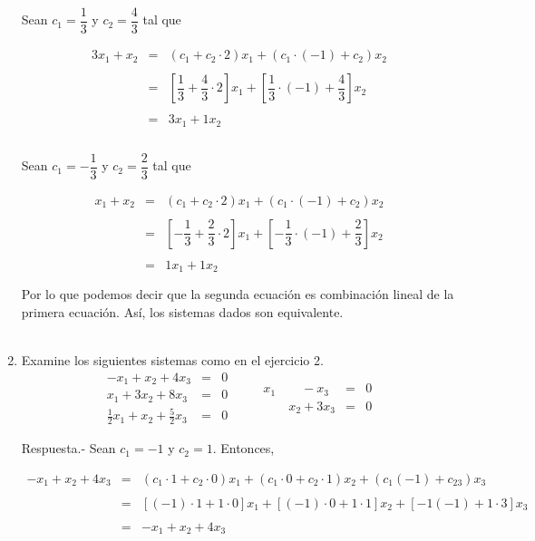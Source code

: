 \begin{enumerate}[\bfseries 1.]
	Sean $c_1=\dfrac{1}{3}$ y $c_2=\dfrac{4}{3}$ tal que

	$$\begin{array}{rcl}
	    3x_1+x_2&=&\left(c_1+c_2\cdot 2\right)x_1+\left(c_1\cdot(-1)+c_2\right)x_2\\\\
		    &=&\left[\dfrac{1}{3}+\dfrac{4}{3}\cdot 2\right]x_1+\left[\dfrac{1}{3}\cdot(-1)+\dfrac{4}{3}\right]x_2\\\\
		    &=&3x_1+1x_2\\\\
	\end{array}$$

	Sean $c_1=-\dfrac{1}{3}$ y $c_2=\dfrac{2}{3}$ tal que

	$$\begin{array}{rcl}
	    x_1+x_2&=&\left(c_1+c_2\cdot 2\right)x_1+\left(c_1\cdot(-1)+c_2\right)x_2\\\\
		   &=&\left[-\dfrac{1}{3}+\dfrac{2}{3}\cdot 2\right]x_1+\left[-\dfrac{1}{3}\cdot(-1)+\dfrac{2}{3}\right]x_2\\\\
		    &=&1x_1+1x_2\\\\
	\end{array}$$
	Por lo que podemos decir que la segunda ecuación es combinación lineal de la primera ecuación. Así, los sistemas dados son equivalente.\\\\

    \item Examine los siguientes sistemas como en el ejercicio 2.
	$$\begin{array}{rcl}
	    -x_1+x_2+4x_3&=&0\\
	    x_1+3x_2 + 8x_3&=&0\\
	    \frac{1}{2}x_1+x_2+\frac{5}{2}x_3&=&0
	\end{array} \qquad
	\begin{array}{rcl}
	    x_1 \qquad -x_3&=&0\\
	    \qquad x_2+3x_3&=&0
	\end{array}$$
	\vspace{.5cm}

	Respuesta.-\; Sean $c_1=-1$ y $c_2=1$. Entonces,

	$$\begin{array}{rcl}
	    -x_1+x_2+4x_3 &=& (c_1\cdot 1+c_2\cdot 0)x_1+(c_1\cdot 0 + c_2\cdot 1)x_2 + (c_1(-1)+c_23)x_3\\\\
			  &=& \left[(-1)\cdot 1+1\cdot 0\right]x_1+\left[(-1)\cdot 0+1\cdot 1\right]x_2+\left[-1(-1)+1\cdot 3\right]x_3\\\\
			  &=& -x_1+x_2+4x_3\\\\
	\end{array}$$


\end{enumerate}
